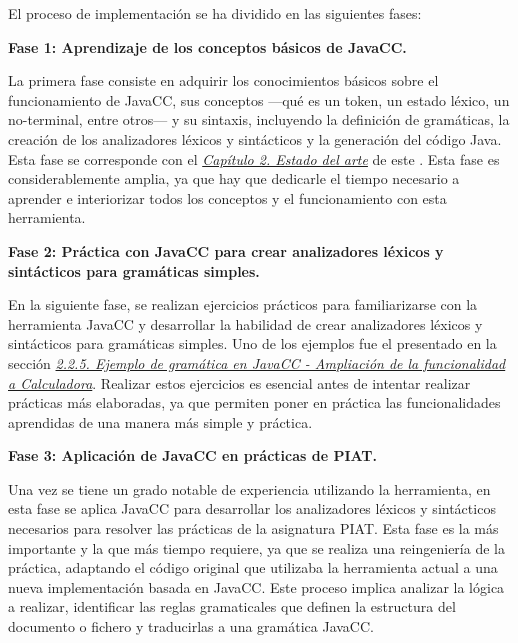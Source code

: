 \noindent El proceso de implementación se ha dividido en las siguientes fases:

\phantom{text}

\noindent \textbf{Fase 1: Aprendizaje de los conceptos básicos de JavaCC.}

\phantom{text}

\noindent La primera fase consiste en adquirir los conocimientos básicos sobre el funcionamiento de JavaCC, sus conceptos ---qué es un token, un estado léxico, un no-terminal, entre otros--- y su sintaxis, incluyendo la definición de gramáticas, la creación de los analizadores léxicos y sintácticos y la generación del código Java. Esta fase se corresponde con el \hyperref[sec:cap2]{\textit{Capítulo 2. Estado del arte}} de este \pfg. Esta fase es considerablemente amplia, ya que hay que dedicarle el tiempo necesario a aprender e interiorizar todos los conceptos y el funcionamiento con esta herramienta.

\phantom{text}

\noindent \textbf{Fase 2: Práctica con JavaCC para crear analizadores léxicos y sintácticos para gramáticas simples.}

\phantom{text}
    
\noindent En la siguiente fase, se realizan ejercicios prácticos para familiarizarse con la herramienta JavaCC y desarrollar la habilidad de crear analizadores léxicos y sintácticos para gramáticas simples. Uno de los ejemplos fue el presentado en la sección \hyperref[sec:ampliacioncalculadora]{\textit{2.2.5. Ejemplo de gramática en JavaCC - Ampliación de la funcionalidad a Calculadora}}. Realizar estos ejercicios es esencial antes de intentar realizar prácticas más elaboradas, ya que permiten poner en práctica las funcionalidades aprendidas de una manera más simple y práctica.

\phantom{text}

\noindent \textbf{Fase 3: Aplicación de JavaCC en prácticas de PIAT.}

\phantom{text}

\noindent Una vez se tiene un grado notable de experiencia utilizando la herramienta, en esta fase se aplica JavaCC para desarrollar los analizadores léxicos y sintácticos necesarios para resolver las prácticas de la asignatura PIAT. Esta fase es la más importante y la que más tiempo requiere, ya que se realiza una reingeniería de la práctica, adaptando el código original que utilizaba la herramienta actual a una nueva implementación basada en JavaCC. Este proceso implica analizar la lógica a realizar, identificar las reglas gramaticales que definen la estructura del documento o fichero y traducirlas a una gramática JavaCC.

